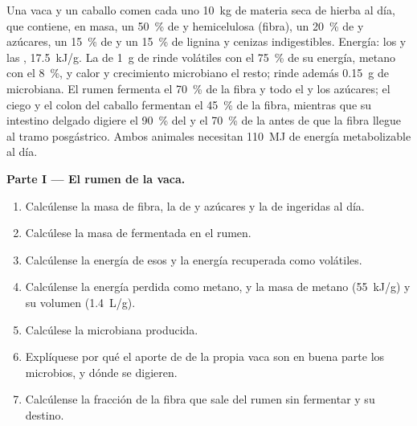 \begin{problem}
\label{pb:b1:digestion-absorption:1}
Una vaca y un caballo comen cada uno \qty{10}{kg} de materia seca de hierba
al día, que contiene, en masa, un \qty{50}{\%} de  y hemicelulosa
(fibra), un \qty{20}{\%} de  y azúcares, un \qty{15}{\%} de 
y un \qty{15}{\%} de lignina y cenizas indigestibles. Energía: los 
y las , \qty{17.5}{kJ/g}. La  de \qty{1}{g} de 
rinde  volátiles con el \qty{75}{\%} de su energía, metano con
el \qty{8}{\%}, y calor y crecimiento microbiano el resto; rinde además
\qty{0.15}{g} de  microbiana. El rumen fermenta el \qty{70}{\%} de
la fibra y todo el  y los azúcares; el ciego y el colon del caballo
fermentan el \qty{45}{\%} de la fibra, mientras que su intestino delgado
digiere el \qty{90}{\%} del  y el \qty{70}{\%} de la  antes
de que la fibra llegue al tramo posgástrico. Ambos animales necesitan
\qty{110}{MJ} de energía metabolizable al día.

\medskip
\noindent\textbf{Parte I --- El rumen de la vaca.}
\begin{enumerate}
  \item Calcúlense la masa de fibra, la de  y azúcares y la de
         ingeridas al día.
  \item Calcúlese la masa de  fermentada en el rumen.
  \item Calcúlense la energía de esos  y la energía recuperada como
         volátiles.
  \item Calcúlense la energía perdida como metano, y la masa de metano
        (\qty{55}{kJ/g}) y su volumen (\qty{1.4}{L/g}).
  \item Calcúlese la  microbiana producida.
  \item Explíquese por qué el aporte de  de la propia vaca son en
        buena parte los microbios, y dónde se digieren.
  \item Calcúlense la fracción de la fibra que sale del rumen sin fermentar
        y su destino.
\end{enumerate}


\end{problem}
